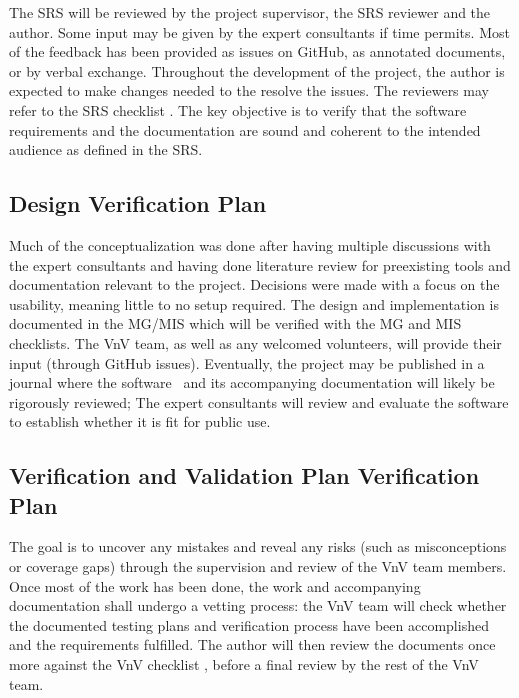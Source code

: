 \documentclass[12pt, titlepage]{article}
\begin{document}
The SRS will be reviewed by the project supervisor, the SRS reviewer and the author. Some input
may be given by the expert consultants if time permits. Most of the feedback has been provided 
as issues on GitHub, as annotated documents, or by verbal exchange. 
Throughout the development of the project, the author is expected 
to make changes needed to the resolve the issues. The reviewers may refer to the SRS checklist \citep{SRS_checklist}.
The key objective is to verify that the software requirements and the documentation are sound 
and coherent to the intended audience as defined in the SRS.


\subsection{Design Verification Plan} \label{sec_design_vplan}

Much of the conceptualization was done after having multiple discussions with the expert 
consultants and having done literature review for preexisting tools and documentation 
relevant to the project. Decisions were made with a focus on the usability, meaning little to 
no setup required. The design and implementation is documented in the 
MG\citep{MG}/MIS\citep{MIS} which will be verified with the MG \cite{MG_checklist}
and MIS \cite{MIS_checklist} checklists.
The VnV team, as well as any welcomed volunteers, will provide
their input (through GitHub issues). Eventually, the project may be published in a journal
where the software \progname~and its accompanying documentation will 
likely be rigorously reviewed; The expert consultants will review and evaluate the software to
establish whether it is fit for public use.



\subsection{Verification and Validation Plan Verification Plan}

The goal is to uncover any mistakes and reveal any risks (such as misconceptions or coverage gaps) 
through the supervision and 
review of the VnV team members. Once most of the work has been done, the work and
accompanying documentation shall undergo a vetting process: the VnV team
will check whether the documented testing plans and verification process have been 
accomplished and the requirements fulfilled. The author will then review the documents once more
against the VnV checklist \citep{VnV_checklist}, before a final review by the rest of the VnV team.
\end{document}
